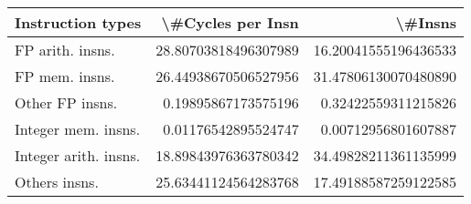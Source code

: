 \begin{tabular}{lrr}
\toprule
     Instruction types &     \textbackslash \#Cycles per Insn &               \textbackslash \#Insns \\
\midrule
      FP arith. insns. &  28.80703818496307989 &  16.20041555196436533 \\
        FP mem. insns. &  26.44938670506527956 &  31.47806130070480890 \\
       Other FP insns. &   0.19895867173575196 &   0.32422559311215826 \\
   Integer mem. insns. &   0.01176542895524747 &   0.00712956801607887 \\
 Integer arith. insns. &  18.89843976363780342 &  34.49828211361135999 \\
         Others insns. &  25.63441124564283768 &  17.49188587259122585 \\
\bottomrule
\end{tabular}
